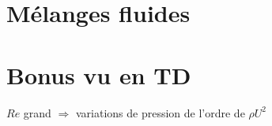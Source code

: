 \documentclass[10pt,a4paper,twocolumn,fleqn]{article}
\begin{document}
\section{Mélanges fluides} %


\section{Bonus vu en TD}
$Re$ grand $\Rightarrow$ variations de pression de l'ordre de $\rho U^2$

\nocite{*}


\end{document}

